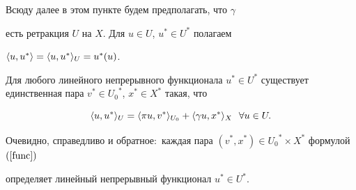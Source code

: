 Всюду далее в этом пункте будем предполагать, что $\gamma$


есть ретракция $U$ на $X$. Для $u \in U$, $u^* \in U^*$ полагаем


$\langle u,u^*\rangle=\langle u,u^* \rangle_U=u^*(u)$.





\begin{lems}


Для любого линейного непрерывного функционала $u^* \in


U^*$ существует единственная пара $v^* \in {U_0}^*$, $x^* \in


X^*$ такая, что


\begin{equation}


\la u, u^*\ra _U=\la \pi u, v^*\ra _{U_0}+\la \gamma u,


x^*\ra _X \ \ \forall u \in U. \label{func}


\end{equation}


Очевидно, справедливо и обратное\/${:}$ каждая пара $(v^*,


x^*) \in {U_0}^* \times X^*$ формулой $(\ref{func})$


определяет линейный непрерывный функционал $u^* \in U^*$.


\end{lems}





